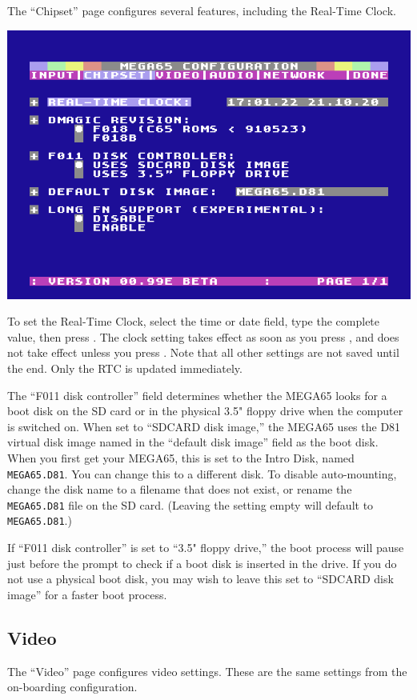 The ``Chipset'' page configures several features, including the Real-Time Clock.

\begin{center}
  \includegraphics[width=0.7\linewidth]{images/ss-m65config-2.png}
\end{center}

To set the Real-Time Clock, select the time or date field, type the complete value, then press . The clock setting takes effect as soon as you press , and does not take effect unless you press . Note that all other settings are not saved until the end. Only the RTC is updated immediately.

The ``F011 disk controller'' field determines whether the MEGA65 looks for a boot disk on the SD card or in the physical 3.5" floppy drive when the computer is switched on. When set to ``SDCARD disk image,'' the MEGA65 uses the D81 virtual disk image named in the ``default disk image'' field as the boot disk. When you first get your MEGA65, this is set to the Intro Disk, named {\tt MEGA65.D81}. You can change this to a different disk. To disable auto-mounting, change the disk name to a filename that does not exist, or rename the {\tt MEGA65.D81} file on the SD card. (Leaving the setting empty will default to {\tt MEGA65.D81}.)

If ``F011 disk controller'' is set to ``3.5" floppy drive,'' the boot process will pause just before the  prompt to check if a boot disk is inserted in the drive. If you do not use a physical boot disk, you may wish to leave this set to ``SDCARD disk image'' for a faster boot process.

\subsection{Video}

The ``Video'' page configures video settings. These are the same settings from the on-boarding configuration.

